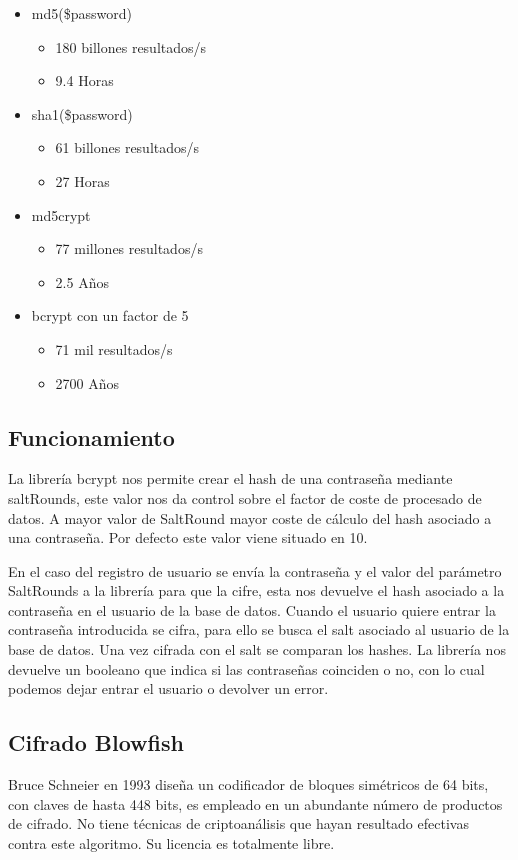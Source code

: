 \begin{itemize}
\item md5(\$password) 
\begin{itemize}
\item 180 billones resultados/s
\item 9.4 Horas
\end{itemize}
\item sha1(\$password)
\begin{itemize}
\item 61 billones resultados/s
\item 27 Horas
\end{itemize}
\item md5crypt
\begin{itemize}
\item 77 millones resultados/s
\item 2.5 Años
\end{itemize}
\item bcrypt con un factor de 5 
\begin{itemize}
\item 71 mil resultados/s
\item 2700 Años
\end{itemize}
\end{itemize}


\subsection{Funcionamiento}
La librería bcrypt nos permite crear el hash de una contraseña mediante saltRounds, este valor nos da control sobre el factor de coste de procesado de datos. A mayor valor de SaltRound mayor coste de cálculo del hash asociado a una contraseña.  Por defecto este valor viene situado en 10. 


En el caso del registro de usuario se envía la contraseña y el valor del parámetro SaltRounds a la librería para que la cifre, esta nos devuelve el hash asociado a la contraseña en el usuario de la base de datos. Cuando el usuario quiere entrar la contraseña introducida se cifra, para ello se busca el salt asociado al usuario de la base de datos. Una vez cifrada con el salt se comparan los hashes. La librería nos devuelve un booleano que indica si las contraseñas coinciden o no, con lo cual podemos dejar entrar el usuario o devolver un error.


\subsection{Cifrado Blowfish}
Bruce Schneier en 1993 diseña un codificador de bloques simétricos de 64 bits, con claves de hasta 448 bits, es empleado en un abundante número de productos de cifrado. No tiene técnicas de criptoanálisis que hayan resultado efectivas contra este algoritmo. Su licencia es totalmente libre.


